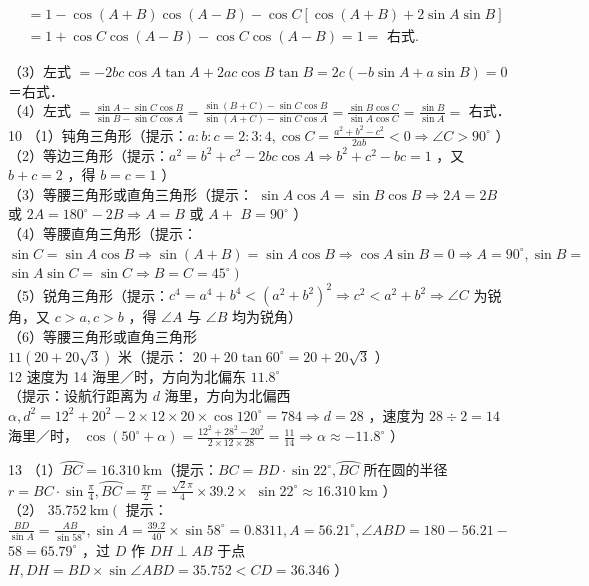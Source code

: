 \documentclass[10pt]{article}
\begin{document}
\[
\begin{aligned}
& =1-\cos (A+B) \cos (A-B)-\cos C[\cos (A+B)+2 \sin A \sin B] \\
& =1+\cos C \cos (A-B)-\cos C \cos (A-B)=1=\text { 右式. }
\end{aligned}
\]

（3）左式 \(=-2 b c \cos A \tan A+2 a c \cos B \tan B=2 c(-b \sin A+a \sin B)=0\)＝右式．\\
（4）左式 \(=\frac{\sin A-\sin C \cos B}{\sin B-\sin C \cos A}=\frac{\sin (B+C)-\sin C \cos B}{\sin (A+C)-\sin C \cos A}=\frac{\sin B \cos C}{\sin A \cos C}=\frac{\sin B}{\sin A}=\) 右式．\\
10 （1）钝角三角形（提示：\(a: b: c=2: 3: 4, \cos C=\frac{a^{2}+b^{2}-c^{2}}{2 a b}<0 \Rightarrow \angle C>90^{\circ}\) ）\\
（2）等边三角形（提示：\(a^{2}=b^{2}+c^{2}-2 b c \cos A \Rightarrow b^{2}+c^{2}-b c=1\) ，又 \(b+c=2\) ，得 \(b=c=1\) ）\\
（3）等腰三角形或直角三角形（提示： \(\sin A \cos A=\sin B \cos B \Rightarrow 2 A=2 B\) 或 \(2 A=180^{\circ}-2 B \Rightarrow A=B\) 或 \(A+\) \(B=90^{\circ}\) ）\\
（4）等腰直角三角形（提示： \(\sin C=\sin A \cos B \Rightarrow \sin (A+B)=\sin A \cos B \Rightarrow \cos A \sin B=0 \Rightarrow A=90^{\circ}, \sin B=\) \(\left.\sin A \sin C=\sin C \Rightarrow B=C=45^{\circ}\right)\)\\
（5）锐角三角形（提示：\(c^{4}=a^{4}+b^{4}<\left(a^{2}+b^{2}\right)^{2} \Rightarrow c^{2}<a^{2}+b^{2} \Rightarrow \angle C\) 为锐角，又 \(c>a, c>b\) ，得 \(\angle A\) 与 \(\angle B\) 均为锐角）\\
（6）等腰三角形或直角三角形\\
\(11(20+20 \sqrt{3})\) 米（提示： \(20+20 \tan 60^{\circ}=20+20 \sqrt{3}\) ）\\
12 速度为 14 海里／时，方向为北偏东 \(11.8^{\circ}\)\\
（提示：设航行距离为 \(d\) 海里，方向为北偏西 \(\alpha, d^{2}=12^{2}+20^{2}-2 \times 12 \times 20 \times \cos 120^{\circ}=784 \Rightarrow d=28\) ，速度为 \(28 \div 2=14\) 海里／时， \(\cos \left(50^{\circ}+\alpha\right)=\frac{12^{2}+28^{2}-20^{2}}{2 \times 12 \times 28}=\frac{11}{14} \Rightarrow \alpha \approx-11.8^{\circ}\) ）

13 （1）\(\wideparen{B C}=16.310 \mathrm{~km}\)（提示：\(B C=B D \cdot \sin 22^{\circ}, \wideparen{B C}\) 所在圆的半径 \(r=B C \cdot \sin \frac{\pi}{4}, \wideparen{B C}=\frac{\pi r}{2}=\frac{\sqrt{2} \pi}{4} \times 39.2 \times\) \(\sin 22^{\circ} \approx 16.310 \mathrm{~km}\) ）\\
（2） \(35.752 \mathrm{~km}\left(\right.\) 提示：\(\frac{B D}{\sin A}=\frac{A B}{\sin 58^{\circ}}, \sin A=\frac{39.2}{40} \times \sin 58^{\circ}=0.8311, A=56.21^{\circ}, \angle A B D=180-56.21-\) \(58=65.79^{\circ}\) ，过 \(D\) 作 \(D H \perp A B\) 于点 \(H, D H=B D \times \sin \angle A B D=35.752<C D=36.346\) ）
\end{document}
